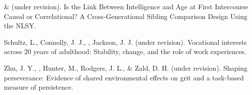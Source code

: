 \item\meb \& \Joe (under revision). Is the Link Between Intelligence and Age at First Intercourse Causal or Correlational? A Cross-Generational Sibling Comparison Design Using the NLSY. %
\item Schultz, L., Connolly, J. J., \meb, Jackson, J. J. (under revision). Vocational interests across 20 years of adulthood: Stability, change, and the role of work experiences.
\item Zhu, J. Y., \meb, Hunter, M., Rodgers, J. L., \& Zald, D. H. (under revision). Shaping perseverance: Evidence of shared environmental effects on grit and a task-based measure of persistence.
\vspace{-2mm}\begin{center}\end{center} \vspace{-4mm}